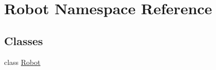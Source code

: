 \hypertarget{namespace_robot}{}\section{Robot Namespace Reference}
\label{namespace_robot}
\subsection*{Classes}
\begin{DoxyCompactItemize}
\item 
class \mbox{\hyperlink{class_robot_1_1_robot}{Robot}}
\end{DoxyCompactItemize}

